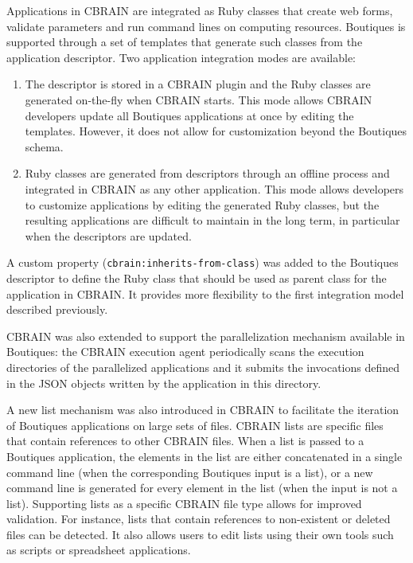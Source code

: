 \documentclass{article}
\newcommand{\boutiques}{Boutiques\xspace}
\begin{document}
Applications in CBRAIN are integrated as Ruby classes that create web
forms, validate parameters and run command lines on computing
resources. \boutiques is supported through a set of templates that
generate such classes from the application descriptor. Two application
integration modes are available:
\begin{enumerate}
  \item The descriptor is stored in a CBRAIN plugin and the Ruby classes
    are generated on-the-fly when CBRAIN starts. This mode allows
    CBRAIN developers update all \boutiques applications at once by
    editing the templates. However, it does not allow for
    customization beyond the \boutiques schema.
  \item Ruby classes are generated from descriptors
    through an offline process and integrated in CBRAIN as any other
    application. This mode allows developers to customize applications
    by editing the generated Ruby classes, but the resulting
    applications are difficult to maintain in the long term, in
    particular when the descriptors are updated.
\end{enumerate}

A custom property (\texttt{cbrain:inherits-from-class}) was added to
the \boutiques descriptor to define the Ruby class that should be used as
parent class for the application in CBRAIN. It provides more
flexibility to the first integration model described previously.

CBRAIN was also extended to support the parallelization mechanism
available in \boutiques: the CBRAIN execution agent periodically scans
the execution directories of the parallelized applications and it submits
the invocations defined in the JSON objects written by the
application in this directory.

A new list mechanism was also introduced in CBRAIN to facilitate the
iteration of \boutiques applications on large sets of files. CBRAIN
lists are specific files that contain references to other CBRAIN
files. When a list is passed to a \boutiques application, the elements
in the list are either concatenated in a single command line (when the
corresponding \boutiques input is a list), or a new command line is
generated for every element in the list (when the input is not a
list). Supporting lists as a specific CBRAIN file type allows for
improved validation. For instance, lists that contain references to
non-existent or deleted files can be detected. It also allows users to
edit lists using their own tools such as scripts or spreadsheet
applications.
\end{document}
